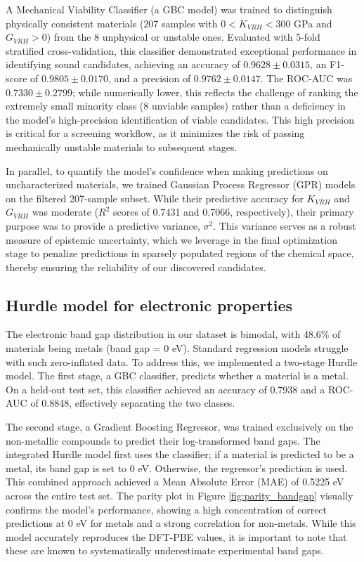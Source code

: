 \documentclass[]{article}
\begin{document}
A Mechanical Viability Classifier (a GBC model) was trained to distinguish physically consistent materials (207 samples with $0 < K_{VRH} < 300$ GPa and $G_{VRH} > 0$) from the 8 unphysical or unstable ones. Evaluated with 5-fold stratified cross-validation, this classifier demonstrated exceptional performance in identifying sound candidates, achieving an accuracy of $0.9628 \pm 0.0315$, an F1-score of $0.9805 \pm 0.0170$, and a precision of $0.9762 \pm 0.0147$. The ROC-AUC was $0.7330 \pm 0.2799$; while numerically lower, this reflects the challenge of ranking the extremely small minority class (8 unviable samples) rather than a deficiency in the model's high-precision identification of viable candidates. This high precision is critical for a screening workflow, as it minimizes the risk of passing mechanically unstable materials to subsequent stages.

In parallel, to quantify the model's confidence when making predictions on uncharacterized materials, we trained Gaussian Process Regressor (GPR) models on the filtered 207-sample subset. While their predictive accuracy for $K_{VRH}$ and $G_{VRH}$ was moderate ($R^2$ scores of 0.7431 and 0.7066, respectively), their primary purpose was to provide a predictive variance, $\sigma^2$. This variance serves as a robust measure of epistemic uncertainty, which we leverage in the final optimization stage to penalize predictions in sparsely populated regions of the chemical space, thereby ensuring the reliability of our discovered candidates.

\subsection{Hurdle model for electronic properties}

The electronic band gap distribution in our dataset is bimodal, with 48.6\% of materials being metals (band gap = 0 eV). Standard regression models struggle with such zero-inflated data. To address this, we implemented a two-stage Hurdle model. The first stage, a GBC classifier, predicts whether a material is a metal. On a held-out test set, this classifier achieved an accuracy of 0.7938 and a ROC-AUC of 0.8848, effectively separating the two classes.

The second stage, a Gradient Boosting Regressor, was trained exclusively on the non-metallic compounds to predict their log-transformed band gaps. The integrated Hurdle model first uses the classifier; if a material is predicted to be a metal, its band gap is set to 0 eV. Otherwise, the regressor's prediction is used. This combined approach achieved a Mean Absolute Error (MAE) of 0.5225 eV across the entire test set. The parity plot in Figure \ref{fig:parity_bandgap} visually confirms the model's performance, showing a high concentration of correct predictions at 0 eV for metals and a strong correlation for non-metals. While this model accurately reproduces the DFT-PBE values, it is important to note that these are known to systematically underestimate experimental band gaps.
\end{document}
